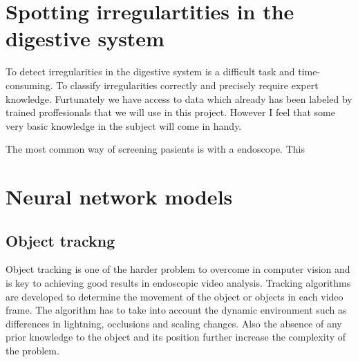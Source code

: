 \documentclass[english, a4paper]{report}
\begin{document}
\section{Spotting irregulartities in the digestive system}

To detect irregularities in the digestive system is a difficult task and time-consuming. To classify irregularities correctly and precisely require expert knowledge. Furtunately we have access to data which already has been labeled by trained proffesionals that we will use in this project. However I feel that some very basic knowledge in the subject will come in handy.

The most common way of screening pasients is with a endoscope. This 







\section{Neural network models}



\subsection{Object trackng}
Object tracking is one of the harder problem to overcome in computer vision and is key to achieving good results in endoscopic video analysis. Tracking algorithms are developed to determine the movement of the object or objects in each video frame. The algorithm has to take into account the dynamic environment such as differences in lightning, occlusions and scaling changes. Also the absence of any prior knowledge to the object and its position further increase the complexity of the problem.
\end{document}

